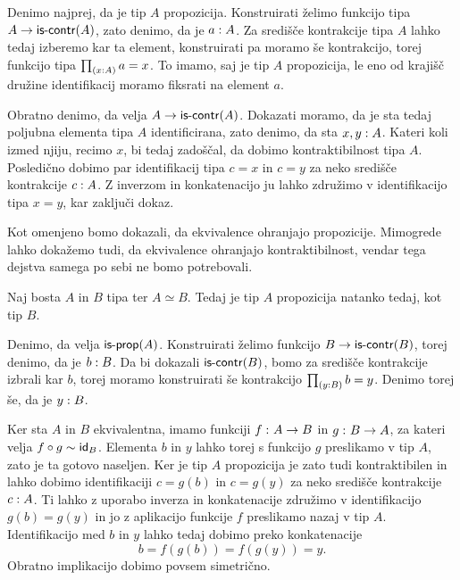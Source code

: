 \begin{dokaz}
  Denimo najprej, da je tip \(A\) propozicija. Konstruirati želimo funkcijo tipa \(A \to \textnormal{\textsf{is-contr}}(A)\), zato denimo, da je \(a : A\). Za središče kontrakcije tipa \(A\) lahko tedaj izberemo kar ta element, konstruirati pa moramo še kontrakcijo, torej funkcijo tipa \(\textstyle \prod_{\left( x : A \right)} a = x\). To imamo, saj je tip \(A\) propozicija, le eno od krajišč družine identifikacij moramo fiksrati na element \(a\).

  Obratno denimo, da velja \(A \to \textnormal{\textsf{is-contr}}(A)\). Dokazati moramo, da je sta tedaj poljubna elementa tipa \(A\) identificirana, zato denimo, da sta \(x, y : A\). Kateri koli izmed njiju, recimo \(x\), bi tedaj zadoščal, da dobimo kontraktibilnost tipa \(A\). Posledično dobimo par identifikacij tipa \(c = x\) in \(c = y\) za neko središče kontrakcije \(c : A\). Z inverzom in konkatenacijo ju lahko združimo v identifikacijo tipa \(x = y\), kar zaključi dokaz.
\end{dokaz}

Kot omenjeno bomo dokazali, da ekvivalence ohranjajo propozicije. Mimogrede lahko dokažemo tudi, da ekvivalence ohranjajo kontraktibilnost, vendar tega dejstva samega po sebi ne bomo potrebovali.

\begin{trditev}
  \label{equiv-preserves-prop}
  Naj bosta \(A\) in \(B\) tipa ter \(A \simeq B\). Tedaj je tip \(A\) propozicija natanko tedaj, kot tip \(B\).
\end{trditev}

\begin{dokaz}
  Denimo, da velja \(\textnormal{\textsf{is-prop}}(A)\). Konstruirati želimo funkcijo \(B \to \textnormal{\textsf{is-contr}}(B)\), torej denimo, da je \(b : B\). Da bi dokazali \(\textnormal{\textsf{is-contr}}(B)\), bomo za središče kontrakcije izbrali kar \(b\), torej moramo konstruirati še kontrakcijo
  \(\textstyle \prod_{\left( y : B \right)} b = y\). Denimo torej še, da je \(y : B\).

  Ker sta \(A\) in \(B\) ekvivalentna, imamo funkciji \(f \,\colon A \to B\) in
  \(g \,\colon B \to A\), za kateri velja \(f \circ g \sim \textnormal{\textsf{id}}_{B}\). Elementa \(b\) in \(y\) lahko torej s funkcijo \(g\) preslikamo v tip \(A\), zato je ta gotovo naseljen. Ker je tip \(A\) propozicija je zato tudi kontraktibilen in lahko dobimo identifikaciji \(c = g(b)\) in \(c = g(y)\) za neko središče kontrakcije \(c : A\). Ti lahko z uporabo inverza in konkatenacije združimo v identifikacijo \(g(b) = g(y)\) in jo z aplikacijo funkcije \(f\) preslikamo nazaj v tip \(A\). Identifikacijo med \(b\) in \(y\) lahko tedaj dobimo preko konkatenacije
  \[b = f(g(b)) = f(g(y)) = y.\]
  Obratno implikacijo dobimo povsem simetrično.
\end{dokaz}

